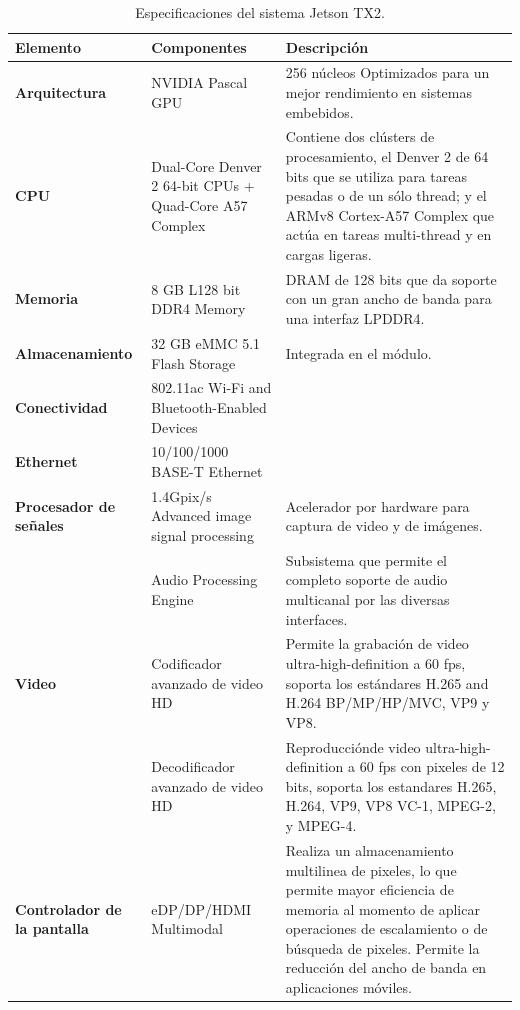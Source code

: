     \begin{table}[h!]
      \begin{center}
            \scriptsize
        \begin{tabular}{|m{2.5cm}|m{6cm}|m{6.5cm}|}
         \hline
        \cellcolor{lightgray}\textbf{Elemento} & \cellcolor{lightgray} \textbf{Componentes} & \cellcolor{lightgray} \textbf{Descripción}\\ 
         \hline
         \textbf{Arquitectura} & NVIDIA Pascal GPU & 256 núcleos Optimizados para un mejor rendimiento en sistemas embebidos.\\
         \hline
         \textbf{CPU} & Dual-Core Denver 2 64-bit CPUs + Quad-Core A57 Complex & Contiene dos clústers de procesamiento, el Denver 2 de 64 bits que se utiliza para tareas pesadas o de un sólo thread; y el ARMv8 Cortex-A57 Complex que actúa en tareas multi-thread y en cargas ligeras.\\
         \hline
         \textbf{Memoria} & 8 GB L128 bit DDR4 Memory & DRAM de 128 bits que da soporte con un gran ancho de banda para una interfaz LPDDR4.  \\
          \hline
    	\textbf{Almacenamiento} & 32 GB eMMC 5.1 Flash Storage & Integrada en el módulo.\\
         \hline
    	\textbf{Conectividad} & 802.11ac Wi-Fi and Bluetooth-Enabled Devices & \\
         \hline
   	 \textbf{Ethernet} &10/100/1000 BASE-T Ethernet & \\
	  \hline
   	 \textbf{Procesador de señales} &1.4Gpix/s Advanced image signal processing & Acelerador por hardware para captura de video y de imágenes.\\
	 &Audio Processing Engine & Subsistema que permite el completo soporte de audio multicanal por las diversas interfaces.\\
	 \hline
   	 \textbf{Video} & Codificador avanzado de video HD & Permite la grabación de video ultra-high-definition a 60 fps, soporta los estándares H.265 and H.264 BP/MP/HP/MVC, VP9 y VP8. \\
	  & Decodificador avanzado de video HD & Reproducciónde video ultra-high-definition a 60 fps con pixeles de 12 bits, soporta los estandares H.265, H.264, VP9, VP8 VC-1, MPEG-2, y MPEG-4. \\
         \hline
   	 \textbf{Controlador de la pantalla} &eDP/DP/HDMI Multimodal & Realiza un almacenamiento multilinea de pixeles, lo que permite mayor eficiencia de memoria al momento de aplicar operaciones de escalamiento o de búsqueda de pixeles. Permite la reducción del ancho de banda en aplicaciones móviles.\\
         \hline
        \end{tabular}
        \caption{Especificaciones del sistema Jetson TX2\cite{jtx2dk}.}
        \label{tab:table1}
      \end{center}
    \end{table}
   
